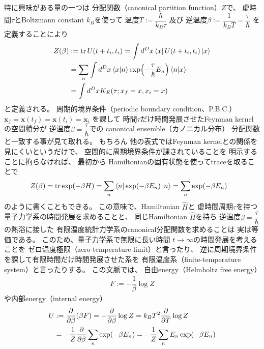 特に興味がある量の一つは
分配関数（canonical partition function）$Z$で、
虚時間$\tau$とBoltzmann constant $k_B$を使って
温度$T := \dfrac{\hbar}{k_B \tau}$
及び
逆温度$ \beta := \dfrac{1}{k_B T}
= \dfrac{\tau}{\hbar} $
を定義することにより
\begin{align}
    Z( \beta )
    &:=
    \tr
    U (t + t_i, t_i)
    =
    \int d^D x
    \bra{ x }
        U (t + t_i, t_i)
    \ket{ x }
\notag\\&
    =
    \sum_n
    \int d^D x
    \braket{ x | n }
        \exp(
            -
            \dfrac{ \tau }{ \hbar }
            E_n
        )
    \braket{ n | x }
\notag\\&
    =
    \int d^D x
    K_E ( \tau; x_f = x,
        x_i = x )
\end{align}
と定義される。
周期的境界条件（periodic boundary condition、P.B.C.）
$\bm{x}_f = \bm{x}(t_f) = \bm{x}(t_i) = \bm{x}_i$
を課して
時間$\tau$だけ時間発展させたFeynman kernelの空間積分が
逆温度$\beta = \dfrac{\tau}{\hbar}$での
canonical ensemble（カノニカル分布）
分配関数と一致する事が見て取れる。
もちろん
他の表式ではFeynman kernelとの関係を見にくいというだけで、
空間的に周期境界条件が課されていることを
明示することに拘らなければ、
最初から
Hamiltonianの固有状態を使ってtraceを取ることで
\begin{align}
    Z( \beta )
    &=
    \tr
        \exp(
            - \beta H
        )
    =
    \sum_n
    \bra{n}
        \exp(
            -
            \beta E_n
        )
    \ket{n}
    =
    \sum_n
    \exp(
        -
        \beta E_n
    )
\end{align}
のように書くこともできる。
この意味で、Hamiltonian $\hat{H}$と
虚時間周期$\tau$を持つ
量子力学系の時間発展を求めることと、
同じHamiltonian $\hat{H}$を持ち
逆温度$\beta = \dfrac{\tau}{\hbar}$の熱浴に接した
有限温度統計力学系のcanonical分配関数を求めることは
実は等価である。
このため、量子力学系で無限に長い時間
$t \to \infty$の時間発展を考えることを
ゼロ温度極限（zero-temperature limit）と言ったり、
逆に周期境界条件を課して有限時間だけ時間発展させた系を
有限温度系（finite-temperature system）と言ったりする。
この文脈では、
自由energy（Helmholtz free energy）
\begin{align}
    F
    :=
    -
    \dfrac{1}{\beta}
        \log Z
\end{align}
や内部energy（internal energy）
\begin{align}
    U
    &:=
    \dfrac{\partial}
        { \partial \beta }
        ( \beta F )
    =
    -
    \dfrac{\partial}
        { \partial \beta }
        \log Z
    =
    k_B T^2
    \dfrac{\partial}
        { \partial T }
        \log Z
\notag\\&
    =
    -
    \dfrac{1}{Z}
    \dfrac{\partial}{\partial \beta}
    \sum_n
    \exp(
        -
        \beta E_n
    )
    =
    -
    \dfrac{1}{Z}
    \sum_n
    E_n
    \exp(
        -
        \beta E_n
    )
\end{align}
